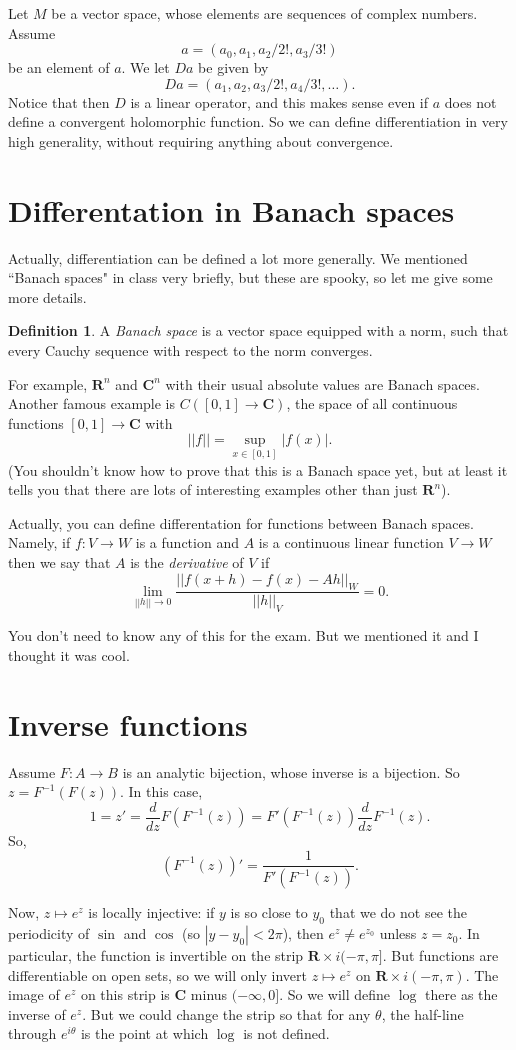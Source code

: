 \documentclass[12pt]{report}
\newcommand{\RR}{\mathbf{R}}
\newcommand{\CC}{\mathbf{C}}
\newcommand{\dfn}[1]{\emph{#1}\index{#1}}
\theoremstyle{definition}
\newtheorem{definition}[theorem]{Definition}
\theoremstyle{remark}
\begin{document}
Let $M$ be a vector space, whose elements are sequences of complex numbers. Assume
$$a = (a_0, a_1, a_2/2!, a_3/3!)$$
be an element of $a$. We let $Da$ be given by
$$Da = (a_1, a_2, a_3/2!, a_4/3!, \dots).$$
Notice that then $D$ is a linear operator, and this makes sense even if $a$ does not define a convergent holomorphic function. So we can define differentiation in very high generality, without requiring anything about convergence.


\section{Differentation in Banach spaces}
Actually, differentiation can be defined a lot more generally. We mentioned ``Banach spaces" in class very briefly, but these are spooky, so let me give some more details.

\begin{definition}
A \dfn{Banach space} is a vector space equipped with a norm, such that every Cauchy sequence with respect to the norm converges.
\end{definition}
For example, $\RR^n$ and $\CC^n$ with their usual absolute values are Banach spaces. Another famous example is $C([0, 1] \to \CC)$, the space of all continuous functions $[0, 1] \to \CC$ with
$$||f|| = \sup_{x \in [0, 1]} |f(x)|.$$
(You shouldn't know how to prove that this is a Banach space yet, but at least it tells you that there are lots of interesting examples other than just $\RR^n$).

Actually, you can define differentation for functions between Banach spaces. Namely, if $f: V \to W$ is a function and $A$ is a continuous linear function $V \to W$ then we say that $A$ is the \dfn{derivative} of $V$ if
$$\lim_{||h|| \to 0} \frac{||f(x+h) - f(x) - Ah||_W}{||h||_V} = 0.$$

You don't need to know any of this for the exam. But we mentioned it and I thought it was cool.


\section{Inverse functions}
Assume $F: A \to B$ is an analytic bijection, whose inverse is a bijection. So $z = F^{-1}(F(z))$. In this case,
$$1 = z' = \frac{d}{dz}F(F^{-1}(z)) = F'(F^{-1}(z)) \frac{d}{dz} F^{-1}(z).$$
So,
$$(F^{-1}(z))' = \frac{1}{F'(F^{-1}(z))}.$$

Now, $z \mapsto e^z$ is locally injective: if $y$ is so close to $y_0$ that we do not see the periodicity of $\sin$ and $\cos$ (so $|y - y_0| < 2\pi$), then $e^z \neq e^{z_0}$ unless $z = z_0$. In particular, the function is invertible on the strip $\RR \times i(-\pi, \pi]$. But functions are differentiable on open sets, so we will only invert $z \mapsto e^z$ on $\RR \times i(-\pi, \pi)$. The image of $e^z$ on this strip is $\CC$ minus $(-\infty, 0]$. So we will define $\log$ there as the inverse of $e^z$. But we could change the strip so that for any $\theta$, the half-line through $e^{i\theta}$ is the point at which $\log$ is not defined.
\end{document}

